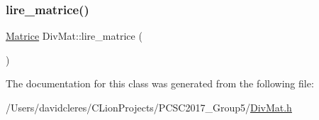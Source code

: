 \mbox{\label{class_div_mat_ad47640fad4498c8bcd98c1cc4f4d5c5a}} 
\subsubsection{\texorpdfstring{lire\+\_\+matrice()}{lire\_matrice()}}
{\footnotesize\ttfamily \mbox{\hyperlink{_div_mat_8h_a5cd1306cd22bb9a4a8d8b6ead3f49a08}{Matrice}} Div\+Mat\+::lire\+\_\+matrice (\begin{DoxyParamCaption}{ }\end{DoxyParamCaption})}



The documentation for this class was generated from the following file\+:\begin{DoxyCompactItemize}
\item 
/\+Users/davidcleres/\+C\+Lion\+Projects/\+P\+C\+S\+C2017\+\_\+\+Group5/\mbox{\hyperlink{_div_mat_8h}{Div\+Mat.\+h}}\end{DoxyCompactItemize}
